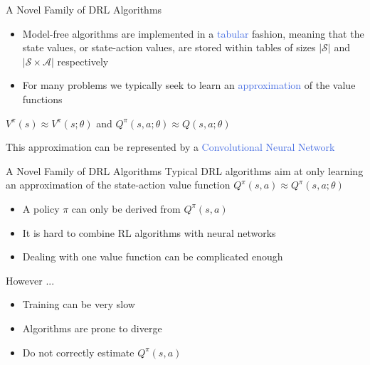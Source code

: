 \documentclass{beamer}
\begin{document}
\begin{frame}{A Novel Family of DRL Algorithms}
	\begin{itemize}
		\item Model-free algorithms are implemented in a \textcolor{RoyalBlue}{tabular} fashion, meaning that the state values, or state-action values, are stored within tables of sizes $|\mathcal{S}|$ and $|\mathcal{S}\times\mathcal{A}|$ respectively

		\item For many problems we typically seek to learn an \textcolor{RoyalBlue}{approximation} of the value functions
	\end{itemize}
	
	\begin{center}

		$V^{\pi}(s)\approx V^\pi{(s;\theta)}$ and $Q^{\pi}(s,a;\theta)\approx Q(s,a;\theta)$
	\end{center}
	
	\bigskip

	This approximation can be represented by a \textcolor{RoyalBlue}{Convolutional Neural Network}

\end{frame}

\begin{frame}{A Novel Family of DRL Algorithms}
	Typical DRL algorithms aim at only learning an approximation of the state-action value function $Q^{\pi}(s,a)\approx Q^{\pi}(s,a;\theta)$

	\begin{itemize}
		\item A policy $\pi$ can only be derived from $Q^{\pi}(s,a)$ 
		\item It is hard to combine RL algorithms with neural networks
		\item Dealing with one value function can be complicated enough
	\end{itemize}

	\bigskip

	However ...

	\begin{itemize}
		\item Training can be very slow 
		\item Algorithms are prone to diverge
		\item Do not correctly estimate $Q^{\pi}(s,a)$
	\end{itemize}

\end{frame}
\end{document}
